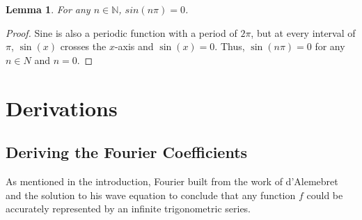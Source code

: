\documentclass[11pt]{amsart}
\theoremstyle{plain}
\newtheorem{lemma}[theorem]{Lemma}
\theoremstyle{definition}
\newcommand{\N}{\mathbb N}
\begin{document}
\begin{lemma} \label{lem:trig2}
    For any $n\in\N$, $sin(n\pi) = 0$.
\end{lemma}
\begin{proof}
    Sine is also a periodic function with a period of $2\pi$, but at every interval of $\pi$, $\sin(x)$ crosses the $x$-axis and $\sin(x)=0$. Thus, $\sin(n\pi) = 0$ for any $n\in N$ and $n=0$. 
\end{proof}

\section{Derivations}
\subsection{Deriving the Fourier Coefficients}\label{deriving}
As mentioned in the introduction, Fourier built from the work of d'Alemebret and the solution to his wave equation to conclude that any function $f$ could be accurately represented by an infinite trigonometric series.
\end{document}
